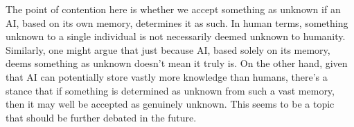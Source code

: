 The point of contention here is whether we accept something as unknown if an AI, based on its own memory, determines it as such. In human terms, something unknown to a single individual is not necessarily deemed unknown to humanity. Similarly, one might argue that just because AI, based solely on its memory, deems something as unknown doesn't mean it truly is. On the other hand, given that AI can potentially store vastly more knowledge than humans, there's a stance that if something is determined as unknown from such a vast memory, then it may well be accepted as genuinely unknown. This seems to be a topic that should be further debated in the future.



